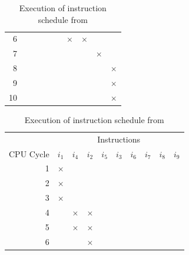 \begin{table}
\begin{subtable}{0.48\textwidth}
\begin{tabular}{rccccccccc}
             6 &   &   &   &   &   &$\boldsymbol{\times}$&$\boldsymbol{\times}$&   &   \\
             7 &   &   &   &   &   &   &   &$\boldsymbol{\times}$&   \\ \rowcolor[gray]{.975}
             8 &   &   &   &   &   &   &   &   &$\boldsymbol{\times}$\\
             9 &   &   &   &   &   &   &   &   &$\boldsymbol{\times}$\\ \rowcolor[gray]{.975}
            10 &   &   &   &   &   &   &   &   &$\boldsymbol{\times}$\\
            \bottomrule
        \end{tabular}
        \caption{Execution of instruction schedule from }
        \label{tbl:bg:schedule-comparison-a}
    \end{subtable}
    \hfill
    \begin{subtable}{0.48\textwidth}
        \begin{tabular}{rccccccccc} \toprule
            & \multicolumn{9}{c}{\fontsize{11pt}{9pt}\selectfont Instructions} \\
            \cmidrule{2-10}
            {\fontsize{11pt}{9pt}\selectfont CPU Cycle} & 
            {\fontsize{11pt}{9pt}\selectfont $i_1$} & 
            {\fontsize{11pt}{9pt}\selectfont $i_4$} & 
            {\fontsize{11pt}{9pt}\selectfont $i_2$} & 
            {\fontsize{11pt}{9pt}\selectfont $i_5$} & 
            {\fontsize{11pt}{9pt}\selectfont $i_3$} & 
            {\fontsize{11pt}{9pt}\selectfont $i_6$} & 
            {\fontsize{11pt}{9pt}\selectfont $i_7$} & 
            {\fontsize{11pt}{9pt}\selectfont $i_8$} & 
            {\fontsize{11pt}{9pt}\selectfont $i_9$} \\
            \midrule
             1 &$\boldsymbol{\times}$&   &   &   &   &   &   &   &   \\ \rowcolor[gray]{.975}
             2 &$\boldsymbol{\times}$&   &   &   &   &   &   &   &   \\
             3 &$\boldsymbol{\times}$&   &   &   &   &   &   &   &   \\ \rowcolor[gray]{.975}
             4 &   &$\boldsymbol{\times}$&$\boldsymbol{\times}$&   &   &   &   &   &   \\
             5 &   &$\boldsymbol{\times}$&$\boldsymbol{\times}$&   &   &   &   &   &   \\ \rowcolor[gray]{.975}
             6 &   &   &$\boldsymbol{\times}$&   &   &   &   &   &   \\

\end{tabular}
\end{subtable}
\end{table}
